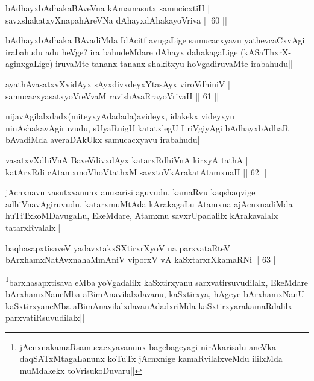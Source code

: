 \begin{shl}
bAdhayxbAdhakaBAveVna kAmamasutx samucicxtiH |\\
savxshakatxyXnapahAreVNa dAhayxdAhakayoVriva \hfill || 60 ||
\end{shl}

\begin{artha}
bAdhayxbAdhaka BAvadiMda IdAcitf avugaLige samucacxyavu yathevcaCxvAgi irabahudu adu heVge? ira bahudeMdare dAhayx dahakagaLige (kASaThxrX-aginxgaLige) iruvaMte tananx tananx shakitxyu hoVgadiruvaMte irabahudu||
\end{artha}

\begin{shl}
ayathAvasatxvXvidAyx sAyxdivxdeyxYtasAyx viroVdhiniV |\\
samucacxyasatxyoVreVvaM ravishAvaRrayoVrivaH \hfill || 61 ||
\end{shl}

\begin{artha}
nijavAgilalxdadx(miteyxyAdadada)avideyx, idakekx videyxyu ninAshakavAgiruvudu, sUyaRnigU katatxlegU I riVgiyAgi bAdhayxbAdhaR bAvadiMda averaDAkUkx samucacxyavu irabahudu||
\end{artha}

\begin{shl}
vasatxvXdhiVnA BaveVdivxdAyx katarxRdhiVnA kirxyA tathA |\\
katArxRdi cA\s \s tamxmoVhoVtathxM savxtoV\s kArakatA\s \s tamxnaH \hfill || 62 ||
\end{shl}

\begin{artha}
jAcnxnavu vasutxvanunx anusarisi aguvudu, kamaRvu kaqshaqvige adhiVnavAgiruvudu, katarxmuMtAda kArakagaLu Atamxna ajAcnxnadiMda huTiTxkoMDavugaLu, EkeMdare, Atamxnu savxrUpadalilx kArakavalalx tatarxRvalalx||
\end{artha}

\begin{shl}
baqhasapxtisaveV yadavxtakxSXtirxrXyoV na parxvataRteV |\\
bArxhamxNatAvxnahaMmAniV viporxV vA kaSxtarxrXkamaRNi \hfill || 63 ||
\end{shl}

\begin{artha}
\footnote{jAcnxnakamaRsamucacxyavanunx bagebageyagi nirAkarisalu aneVka daqSATxMtagaLanunx koTuTx jAcnxnige kamaRvilalxveMdu ililxMda muMdakekx toVrisukoDuvaru||}barxhasapxtisava eMba yoVgadalilx kaSxtirxyanu sarxvatirsuvudilalx, EkeMdare bArxhamxNaneMba aBimAnavilalxdavanu, kaSxtirxya, hAgeye bArxhamxNanU  kaSxtirxyaneMba aBimAnavilalxdavanAdadxriMda kaSxtirxyarakamaRdalilx parxvatiRsuvudilalx||
\end{artha}

